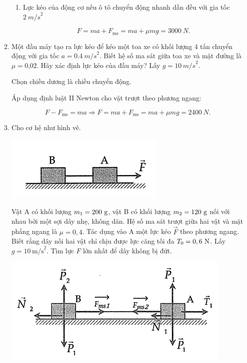 \begin{enumerate}[label=\bfseries Câu \arabic*:]
{\begin{enumerate}[label=\alph*)]
			$$F = F_\text{ms} = \SI{1000}{N}.$$ 
			
			\item Lực kéo của động cơ nếu ô tô chuyển động nhanh dần đều với gia tốc $\SI{2}{m/s}^2$
			
			$$F = ma + F_\text{ms} = ma + \mu mg = \SI{3000}{N}.$$
		\end{enumerate}
	}
	\item {}
	
	
	{
		Một đầu máy tạo ra lực kéo để kéo một toa xe có khối lượng 4 tấn chuyển động với gia tốc $a = \SI{0,4}{m/s}^2$. Biết hệ số ma sát giữa toa xe và mặt đường là $\mu = \text{0,02}$. Hãy xác định lực kéo của đầu máy? Lấy $g = \SI{10}{m/s}^2$.
	}
	
	\hideall
	{
		Chọn chiều dương là chiều chuyển động.
		
		Áp dụng định luật II Newton cho vật trượt theo phương ngang:
		
		$$F - F_\text{ms} = ma \Rightarrow F = ma + F_\text{ms} = ma + \mu mg = \SI{2400}{N}.$$
	}
		\item {}
	
	
	{Cho cơ hệ như hình vẽ.
		\begin{center}
			\includegraphics[scale=0.8]{../figs/VN10-2021-PH-TP012-1.png}
		\end{center}
		Vật A có khối lượng $m_1=200\ \text g$, vật B có khối lượng $m_2=120\ \text g$ nối với nhau bởi một sợi dây nhẹ, không dãn. Hệ số ma sát trượt giữa hai vật và mặt phẳng ngang là $\mu = 0,4$. Tác dụng vào A một lực kéo $\vec F$ theo phương ngang. Biết rằng dây nối hai vật chỉ chịu được lực căng tối đa $T_0=0,6\ \text N$. Lấy $g=10\ \text{m/s}^2$. Tìm lực $F$ lớn nhất để dây không bị đứt.
	}
	
	\hideall
	{	\begin{center}
			\includegraphics[scale=0.8]{../figs/VN10-2021-PH-TP012-2.png}
		\end{center}
		
}
\end{enumerate}
